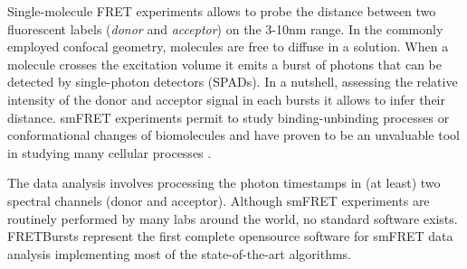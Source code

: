 
Single-molecule FRET experiments allows to probe the distance between two fluorescent labels (\textit{donor} and \textit{acceptor}) on the 3-10nm range. In the commonly employed confocal geometry, molecules are free to diffuse in a solution. When a molecule crosses the excitation volume it emits a burst of photons that can be detected by single-photon detectors (SPADs). In a nutshell, assessing the relative intensity of the donor and acceptor signal in each bursts it allows to infer their distance. smFRET experiments permit to study binding-unbinding processes or conformational changes of biomolecules and have proven to be an unvaluable tool in studying many cellular processes \cite{Kapanidis_2006}.

The data analysis involves processing the photon timestamps in (at least) two spectral channels (donor and acceptor). 
Although smFRET experiments are routinely performed by many labs around the world, no standard software exists. FRETBursts represent the first complete opensource software for smFRET data analysis implementing most of the state-of-the-art algorithms. 
